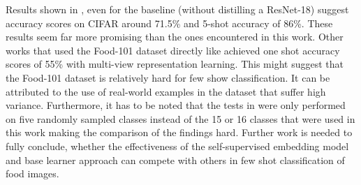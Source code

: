 Results shown in \cite{tian_rethinking_2020}, even for the baseline (without distilling a ResNet-18) suggest accuracy 
scores on CIFAR around 71.5\% and 5-shot accuracy of 86\%. These results seem far more promising than the 
ones encountered in this work. Other works that used the Food-101 dataset directly like \cite{jiang_few-shot_2020} achieved
one shot accuracy scores of 55\% with multi-view representation learning. This might suggest that the Food-101 
dataset is relatively hard for few show classification. It can be attributed to the use of real-world examples in the 
dataset that suffer high variance.
Furthermore, it has to be noted that the tests in \cite{jiang_few-shof_2020} were only performed on 
five randomly sampled classes \cite{jiang_few-shot_2020}
instead of the 15 or 16 classes that were used in this work making the comparison of the findings hard.
Further work is needed to fully conclude, whether the effectiveness of the self-supervised embedding model
and base learner approach can compete with others in few shot classification of food images.
